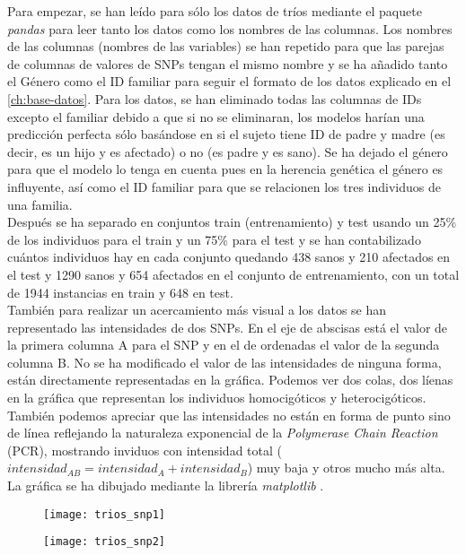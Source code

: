 Para empezar, se han leído para sólo los datos de tríos mediante el paquete \textit{pandas} \cite{mckinney-proc-scipy-2010} para leer tanto los datos como los nombres de las columnas. Los nombres de las columnas (nombres de las variables) se han repetido para que las parejas de columnas de valores de SNPs tengan el mismo nombre y se ha añadido tanto el Género como el ID familiar para seguir el formato de los datos explicado en el \autoref{ch:base-datos}. Para los datos, se han eliminado todas las columnas de IDs excepto el familiar debido a que si no se eliminaran, los modelos harían una predicción perfecta sólo basándose en si el sujeto tiene ID de padre y madre (es decir, es un hijo y es afectado) o no (es padre y es sano). Se ha dejado el género para que el modelo lo tenga en cuenta pues en la herencia genética el género es influyente, así como el ID familiar para que se relacionen los tres individuos de una familia.\\
Después se ha separado en conjuntos train (entrenamiento) y test usando un 25\% de los individuos para el train y un 75\% para el test y se han contabilizado cuántos individuos hay en cada conjunto quedando 438 sanos y 210 afectados en el test y 1290 sanos y 654 afectados en el conjunto de entrenamiento, con un total de 1944 instancias en train y 648 en test.\\
También para realizar un acercamiento más visual a los datos se han representado las intensidades de dos SNPs. En el eje de abscisas está el valor de la primera columna A para el SNP y en el de ordenadas el valor de la segunda columna B. No se ha modificado el valor de las intensidades de ninguna forma, están directamente representadas en la gráfica. Podemos ver dos colas, dos líenas en la gráfica que representan los individuos homocigóticos y heterocigóticos. También podemos apreciar que las intensidades no están en forma de punto sino de línea reflejando la naturaleza exponencial de la \textit{Polymerase Chain Reaction} (PCR), mostrando inviduos con intensidad total ($intensidad_{AB}=intensidad_{A}+intensidad_{B}$) muy baja y otros mucho más alta. La gráfica se ha dibujado mediante la librería \textit{matplotlib} \cite{Hunter:2007}.

\begin{figure}[H]
\centering
\begin{minipage}{.5\textwidth}
  \centering
  \texttt{[image: trios\_snp1]}
  \label{fig:snp1-trios}
\end{minipage}%
\begin{minipage}{.5\textwidth}
  \centering
  \texttt{[image: trios\_snp2]}
  \label{fig:snp2-trios}
\end{minipage}
\end{figure}


